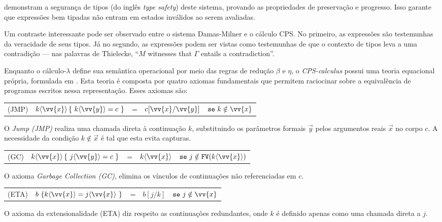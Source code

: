  demonstram a segurança de tipos (do inglês \textit{type safety}) deste sistema, provando as propriedades de preservação e progresso.
Isso garante que expressões bem tipadas não entram em estados inválidos ao serem avaliadas.

Um contraste interessante pode ser observado entre o sistema Damas-Milner e o cálculo CPS.
No primeiro, as expressões são testemunhas da veracidade de seus tipos.
Já no segundo, as expressões podem ser vistas como testemunhas de que o contexto de tipos leva a uma contradição {---} nas palavras de Thielecke, ``$M$ witnesses that $\Gamma$ entails a contradiction''.

Enquanto o cálculo-$\lambda$ define sua semântica operacional por meio das regras de redução $\beta$ e $\eta$, o \textit{CPS-calculus} possui uma teoria equacional própria, formulada em .
Esta teoria é composta por quatro axiomas fundamentais que permitem raciocinar sobre a equivalência de programas escritos nessa representação.
Esses axiomas são:

\phantom{NewLine}

\begin{center}
     \begin{tabular}{llllr}
          (JMP) & $k\langle \vv{x} \rangle \, \{\ k\langle \vv{y} \rangle = c\ \}$ & = & $c[\vv{x} / \vv{y}]$ & $\mathtt{se}\ k \notin \vv{x}$ \\
     \end{tabular}
\end{center}
O \textit{Jump (JMP)} realiza uma chamada direta à continuação $k$, substituindo os parâmetros formais $\vec{y}$ pelos argumentos reais $\vec{x}$ no corpo $c$.
A necessidade da condição $k \notin \vec{x}$ é tal que esta evita capturas.

\begin{center}
     \begin{tabular}{llllr}
          (GC)    & $k\langle \vv{x} \rangle \, \{\ j\langle \vv{y} \rangle = c\ \}$ & = & $k\langle \vv{x} \rangle$ & $\mathtt{se}\ j \notin \mathtt{FV}(k\langle \vv{x}\rangle)$ \\
     \end{tabular}
\end{center}
O axioma \textit{Garbage Collection (GC)}, elimina os vínculos de continuações não referenciadas em $c$.

\begin{center}
     \begin{tabular}{llllr}
          (ETA)   & $b\ \{ k\langle \vv{x} \rangle = j\langle \vv{x} \rangle\ \}$ & = & $b[j / k]$ & $\mathtt{se}\ j \notin \vv{x}$ \\
     \end{tabular}
\end{center}
O axioma da extensionalidade (ETA) diz respeito as continuações redundantes, onde $k$ é definido apenas como uma chamada direta a $j$.

